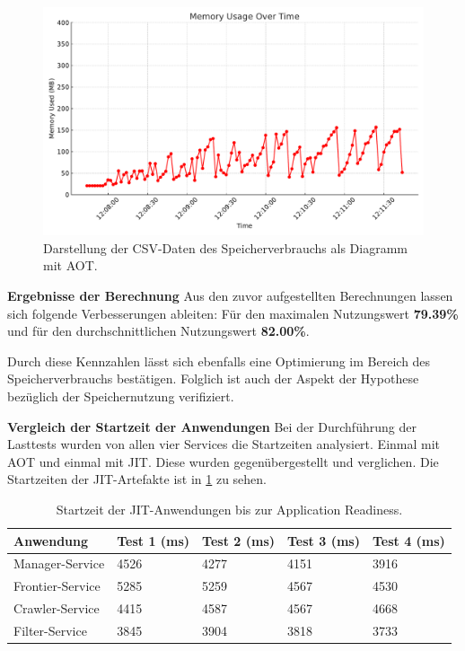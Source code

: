 \begin{figure}[H]
    \centering
    \includegraphics[width=12cm]{images/80_eval/memory_usage_over_time_very_final.pdf}
    \caption[]{Darstellung der CSV-Daten des Speicherverbrauchs als Diagramm mit \acl{AOT}.}
    \label{fig:memaot}
\end{figure}
\textbf{Ergebnisse der Berechnung} \newline
Aus den zuvor aufgestellten Berechnungen lassen sich folgende Verbesserungen ableiten: Für den maximalen Nutzungswert \textbf{79.39\%} und für den durchschnittlichen Nutzungswert \textbf{82.00\%}.

Durch diese Kennzahlen lässt sich ebenfalls eine Optimierung im Bereich des Speicherverbrauchs bestätigen. Folglich ist auch der Aspekt der Hypothese bezüglich der Speichernutzung verifiziert.

\textbf{Vergleich der Startzeit der Anwendungen}\newline
Bei der Durchführung der Lasttests wurden von allen vier Services die Startzeiten analysiert. Einmal mit \ac{AOT} und einmal mit \ac{JIT}. Diese wurden gegenübergestellt und verglichen. Die Startzeiten der \ac{JIT}-Artefakte ist in \ref{tab:startzeitjit} zu sehen.
\begin{table}[H]
\centering
\begin{tabular}{|l|l|l|l|l|}
\hline
\textbf{Anwendung}     & \textbf{Test 1 (ms)} & \textbf{Test 2 (ms)} & \textbf{Test 3 (ms)} & \textbf{Test 4 (ms)} \\ \hline
\multirow{1}{*}{Manager-Service}  & 4526 & 4277 & 4151 & 3916 \\ \hline
\multirow{1}{*}{Frontier-Service}        & 5285 & 5259 & 4567 & 4530 \\ \hline
\multirow{1}{*}{Crawler-Service}         & 4415 & 4587 & 4567 & 4668 \\ \hline
\multirow{1}{*}{Filter-Service}          & 3845 & 3904 & 3818 & 3733 \\ \hline
\end{tabular}
\caption{Startzeit der JIT-Anwendungen bis zur Application Readiness.}
\label{tab:startzeitjit}
\end{table}

